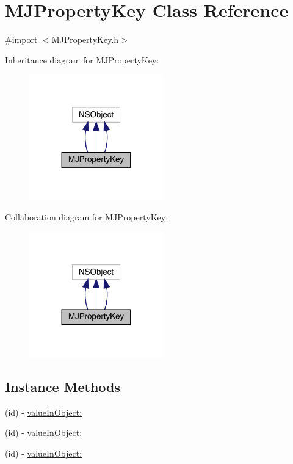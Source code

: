 \hypertarget{interface_m_j_property_key}{}\section{M\+J\+Property\+Key Class Reference}
\label{interface_m_j_property_key}


{\ttfamily \#import $<$M\+J\+Property\+Key.\+h$>$}



Inheritance diagram for M\+J\+Property\+Key\+:\nopagebreak
\begin{figure}[H]
\begin{center}
\leavevmode
\includegraphics[width=164pt]{interface_m_j_property_key__inherit__graph}
\end{center}
\end{figure}


Collaboration diagram for M\+J\+Property\+Key\+:\nopagebreak
\begin{figure}[H]
\begin{center}
\leavevmode
\includegraphics[width=164pt]{interface_m_j_property_key__coll__graph}
\end{center}
\end{figure}
\subsection*{Instance Methods}
\begin{DoxyCompactItemize}
\item 
(id) -\/ \mbox{\hyperlink{interface_m_j_property_key_a7febfc473835f5d17bf904f7c2b05c1c}{value\+In\+Object\+:}}
\item 
(id) -\/ \mbox{\hyperlink{interface_m_j_property_key_a7febfc473835f5d17bf904f7c2b05c1c}{value\+In\+Object\+:}}
\item 
(id) -\/ \mbox{\hyperlink{interface_m_j_property_key_a7febfc473835f5d17bf904f7c2b05c1c}{value\+In\+Object\+:}}
\end{DoxyCompactItemize}
